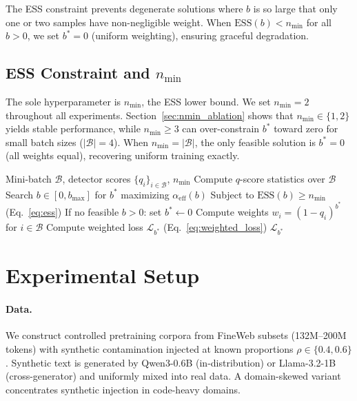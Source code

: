 \documentclass[11pt,a4paper]{article}
\newcommand{\bstar}{b^{*}}
\newcommand{\aeff}{\alpha_{\mathrm{eff}}}
\newcommand{\nmin}{n_{\min}}
\begin{document}
The ESS constraint prevents degenerate solutions where $b$ is so large that only one or two samples have non-negligible weight.
When $\mathrm{ESS}(b) < \nmin$ for all $b > 0$, we set $\bstar = 0$ (uniform weighting), ensuring graceful degradation.

\subsection{ESS Constraint and $\nmin$}

The sole hyperparameter is $\nmin$, the ESS lower bound.
We set $\nmin = 2$ throughout all experiments.
Section~\ref{sec:nmin_ablation} shows that $\nmin \in \{1, 2\}$ yields stable performance, while $\nmin \geq 3$ can over-constrain $\bstar$ toward zero for small batch sizes ($|\mathcal{B}| = 4$).
When $\nmin = |\mathcal{B}|$, the only feasible solution is $\bstar = 0$ (all weights equal), recovering uniform training exactly.

\begin{algorithm}[t]
\caption{Adaptive $\bstar$ Reweighting}
\label{alg:adaptive}
\begin{algorithmic}[1]
\REQUIRE Mini-batch $\mathcal{B}$, detector scores $\{q_i\}_{i \in \mathcal{B}}$, $\nmin$
\STATE Compute $q$-score statistics over $\mathcal{B}$
\STATE Search $b \in [0, b_{\max}]$ for $\bstar$ maximizing $\aeff(b)$
\STATE Subject to $\mathrm{ESS}(b) \geq \nmin$ (Eq.~\ref{eq:ess})
\STATE If no feasible $b > 0$: set $\bstar \leftarrow 0$
\STATE Compute weights $w_i = (1 - q_i)^{\bstar}$ for $i \in \mathcal{B}$
\STATE Compute weighted loss $\mathcal{L}_{\bstar}$ (Eq.~\ref{eq:weighted_loss})
\RETURN $\mathcal{L}_{\bstar}$
\end{algorithmic}
\end{algorithm}

\section{Experimental Setup}
\label{sec:setup}

\paragraph{Data.}
We construct controlled pretraining corpora from FineWeb subsets (132M--200M tokens) with synthetic contamination injected at known proportions $\rho \in \{0.4, 0.6\}$.
Synthetic text is generated by Qwen3-0.6B (in-distribution) or Llama-3.2-1B (cross-generator) and uniformly mixed into real data.
A domain-skewed variant concentrates synthetic injection in code-heavy domains.
\end{document}
